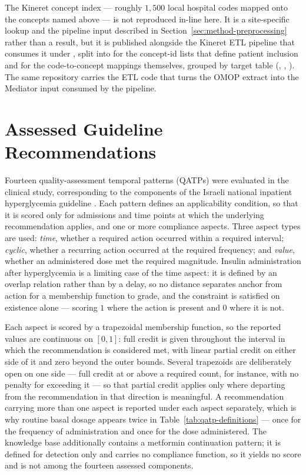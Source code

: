 The Kineret concept index --- roughly $1{,}500$ local hospital codes mapped onto the concepts named above --- is not reproduced in-line here. It is a site-specific lookup and the pipeline input described in Section~\ref{sec:method-preprocessing} rather than a result, but it is published alongside the Kineret ETL pipeline that consumes it \citep{kineret-etl-github} under , split into  for the concept-id lists that define patient inclusion and  for the code-to-concept mappings themselves, grouped by target table (, , ). The same repository carries the ETL code that turns the OMOP extract into the Mediator input consumed by the pipeline.

\section{Assessed Guideline Recommendations}
\label{app:kb-patterns}

Fourteen quality-assessment temporal patterns (QATPs) were evaluated in the
clinical study, corresponding to the components of the Israeli national
inpatient hyperglycemia guideline \citep{hochberg2023inpatient}. Each pattern
defines an applicability condition, so that it is scored only for admissions
and time points at which the underlying recommendation applies, and one or
more compliance aspects. Three aspect types are used: \emph{time}, whether a
required action occurred within a required interval; \emph{cyclic}, whether a
recurring action occurred at the required frequency; and \emph{value},
whether an administered dose met the required magnitude. Insulin
administration after hyperglycemia is a limiting case of the time aspect: it
is defined by an overlap relation rather than by a delay, so no distance
separates anchor from action for a membership function to grade, and the
constraint is satisfied on existence alone --- scoring $1$ where the action
is present and $0$ where it is not.

Each aspect is scored by a trapezoidal membership function, so the reported
values are continuous on $[0,1]$: full credit is given throughout the
interval in which the recommendation is considered met, with linear partial
credit on either side of it and zero beyond the outer bounds. Several
trapezoids are deliberately open on one side --- full credit at or above a
required count, for instance, with no penalty for exceeding it --- so that
partial credit applies only where departing from the recommendation in that
direction is meaningful. A recommendation carrying more than one aspect is
reported under each aspect separately, which is why routine basal dosage
appears twice in Table~\ref{tab:qatp-definitions} --- once for the frequency
of administration and once for the dose administered. The knowledge base
additionally contains a metformin continuation pattern; it is defined for
detection only and carries no compliance function, so it yields no score
and is not among the fourteen assessed components.

